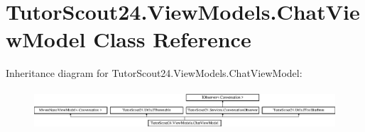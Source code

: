 \hypertarget{class_tutor_scout24_1_1_view_models_1_1_chat_view_model}{}\section{Tutor\+Scout24.\+View\+Models.\+Chat\+View\+Model Class Reference}
\label{class_tutor_scout24_1_1_view_models_1_1_chat_view_model}
Inheritance diagram for Tutor\+Scout24.\+View\+Models.\+Chat\+View\+Model\+:\begin{figure}[H]
\begin{center}
\leavevmode
\includegraphics[height=1.489362cm]{class_tutor_scout24_1_1_view_models_1_1_chat_view_model}
\end{center}
\end{figure}
